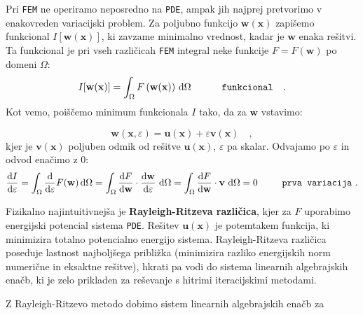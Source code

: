 \documentclass[11pt,a4paper,notitlepage]{article}%
\newcommand{\ud}{\mathrm{d}} 					%
\begin{document}
	Pri \texttt{FEM} ne operiramo neposredno na \texttt{PDE}, ampak jih najprej pretvorimo v enakovreden variacijski problem. Za poljubno funkcijo $\mathbf{w}(\mathbf{x})$ zapišemo funkcional $I[\mathbf{w}(\mathbf{x})]$, ki  zavzame minimalno vrednost, kadar je $\mathbf{w}$ enaka rešitvi. Ta funkcional je pri vseh različicah \texttt{FEM} integral neke funkcije $F = F\left(\mathbf{w}\right)$ po domeni $\Omega$:
	\begin{equation}
		I[\mathbf{w}(\mathbf{x})] = \int_{\Omega} F\left(\mathbf{w}(\mathbf{x})\right) \, \ud \Omega \hspace{1.1cm} \texttt{funkcional} \quad .
	\end{equation}
	Kot vemo, poiščemo minimum funkcionala $I$ tako, da za $\mathbf{w}$ vstavimo:
	
	\setlength{\textheight}{26.5cm}			%
	\pagebreak
	\setlength{\topmargin}{1.6cm}			%
	\setlength{\headheight}{0.0cm}
	\setlength{\headsep}{0.0cm}			%
	\fancyhf{}
	\fancyfoot[C]{\thepage}
	\begin{equation}
		\mathbf{w}(\mathbf{x}, \varepsilon) = \mathbf{u}(\mathbf{x}) + \varepsilon \mathbf{v}(\mathbf{x}) \quad ,
	\end{equation}
	kjer je $\mathbf{v}(\mathbf{x})$ poljuben odmik od rešitve $\mathbf{u}(\mathbf{x})$, $\varepsilon$ pa skalar. Odvajamo po $\varepsilon$ in odvod enačimo z 0:
	\begin{equation}
	\frac{\ud I}{\ud \varepsilon} = \int_{\Omega} \frac{\ud}{\ud \varepsilon} F(\mathbf{w}) \, \ud \Omega = \int_{\Omega} \frac{\ud F}{\ud \mathbf{w}} \cdot \frac{\ud \mathbf{w}}{\ud \varepsilon} \ \ud \Omega = \int_{\Omega} \frac{\ud F}{\ud \mathbf{w}} \cdot \mathbf{v} \ \ud \Omega = 0 \hspace{0.9cm} \texttt{prva variacija} \ .
	\end{equation}
	
	Fizikalno najintuitivnejša je \textbf{Rayleigh-Ritzeva različica}, kjer za $F$ uporabimo energijski potencial sistema \texttt{PDE}. Rešitev $\mathbf{u}(\mathbf{x})$ je potemtakem funkcija, ki minimizira totalno potencialno energijo sistema. Rayleigh-Ritzeva različica poseduje lastnost najboljšega približka (minimizira razliko energijskih norm numerične in eksaktne rešitve), hkrati pa vodi do sistema linearnih algebrajskih enačb, ki je zelo prikladen za reševanje s hitrimi iteracijskimi metodami.
	
	Z Rayleigh-Ritzevo metodo dobimo sistem linearnih algebrajskih enačb za 
	
\end{document}
